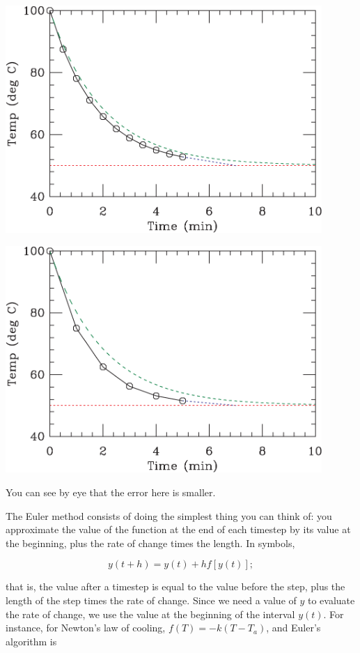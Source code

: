 \documentclass[12ampt]{article}
\begin{document}
\begin{minipage}{0.5\textwidth}
\includegraphics[width=0.9\textwidth]{figbetter-crop.pdf}
\end{minipage}
\begin{minipage}{0.5\textwidth}
\includegraphics[width=0.9\textwidth]{fig5-crop.pdf}
\end{minipage}

You can see by eye that the error here is smaller.

The Euler method consists of doing the simplest thing you can think of: you approximate the value of the function at the end of each timestep by its value at the beginning, plus 
the rate of change times the length. In symbols,

\begin{equation}
  y(t+h) = y(t) + h f\left[y\left(t\right)\right];
\end{equation}

that is, the value after a timestep is equal to the value before the step, plus the length of the step times the rate of change. Since we need a value of $y$ to evaluate the rate
of change, we use the value at the beginning of the interval $y(t)$. For instance, for Newton's law of cooling, $f(T) = -k(T-T_a)$, and Euler's algorithm is
\end{document}
